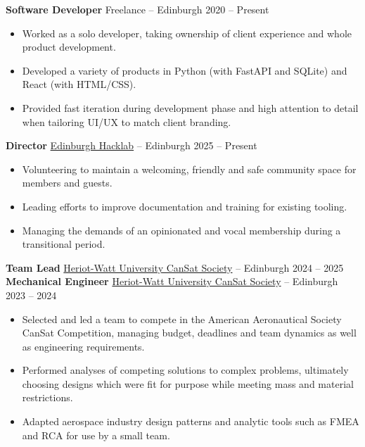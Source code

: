 \textbf{Software Developer} Freelance -- Edinburgh \hfill 2020 -- Present \\

\vspace{-6pt}
\begin{itemize}
	\item Worked as a solo developer, taking ownership of client experience and whole product development.
	\item Developed a variety of products in Python (with FastAPI and SQLite) and React (with HTML/CSS).
	\item Provided fast iteration during development phase and high attention to detail when tailoring UI/UX to match client branding.
\end{itemize}

\textbf{Director} \href{https://edinburghhacklab.com/}{Edinburgh Hacklab} -- Edinburgh \hfill 2025 -- Present \\
\vspace{-6pt}
\begin{itemize}
	\item Volunteering to maintain a welcoming, friendly and safe community space for members and guests.
	\item Leading efforts to improve documentation and training for existing tooling.
	\item Managing the demands of an opinionated and vocal membership during a transitional period.
\end{itemize}

\textbf{Team Lead} \href{https://www.hwunion.com/societies/cansat/}{Heriot-Watt University CanSat Society} -- Edinburgh \hfill 2024 -- 2025 \\

\textbf{Mechanical Engineer} \href{https://www.hwunion.com/societies/cansat/}{Heriot-Watt University CanSat Society} -- Edinburgh \hfill 2023 -- 2024 \\
\vspace{-6pt}
\begin{itemize}
	\item Selected and led a team to compete in the American Aeronautical Society CanSat Competition, managing budget, deadlines and team dynamics as well as engineering requirements.
	\item Performed analyses of competing solutions to complex problems, ultimately choosing designs which were fit for purpose while meeting mass and material restrictions.
	\item Adapted aerospace industry design patterns and analytic tools such as FMEA and RCA for use by a small team.
\end{itemize}

